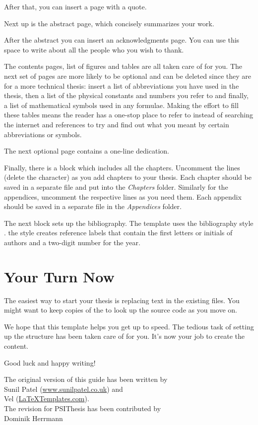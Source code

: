 After that, you can insert a page with a quote.

Next up is the abstract page, which concisely summarizes your work.

After the abstract you can insert an acknowledgments page.
 You can use this space to write about all the people who you wish to thank.

The contents pages,%
list of figures and tables are all taken care of for you. The next set of pages are more likely to be optional and can be deleted since they are for a more technical thesis: insert a list of abbreviations you have used in the thesis, then a list of the physical constants and numbers you refer to and finally, a list of mathematical symbols used in any formulae. Making the effort to fill these tables means the reader has a one-stop place to refer to instead of searching the internet and references to try and find out what you meant by certain abbreviations or symbols.

The next optional page contains a one-line dedication.

Finally, there is a block which includes all the chapters. Uncomment the lines (delete the \code{\%} character) as you add chapters to your thesis. Each chapter should be saved in a separate file and put into the \emph{Chapters} folder. Similarly for the appendices, uncomment the respective lines as you need them. Each appendix should be saved in a separate file in the \emph{Appendices} folder.

The next block sets up the bibliography. The template uses the bibliography style . the  style creates reference labels that contain the first letters or initials of authors and a two-digit number for the year.


\section{Your Turn Now}

The easiest way to start your thesis is replacing text in the existing files. You might want to keep copies of the  to look up the source code as you move on.

We hope that this template helps you get up to speed. The tedious task of setting up the structure has been taken care of for you. It's now your job to create the content.

Good luck and happy writing!

\begin{flushright}
The original version of this guide has been written by\\
Sunil Patel (\href{http://www.sunilpatel.co.uk}{www.sunilpatel.co.uk}) and\\
Vel (\href{http://www.LaTeXTemplates.com}{LaTeXTemplates.com}).\\[2ex]
The revision for PSIThesis has been contributed by\\
Dominik Herrmann
\end{flushright}